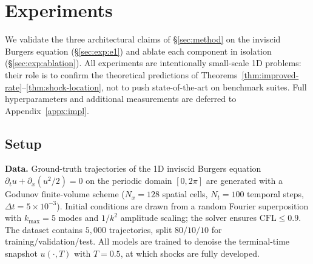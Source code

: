 %
\section{Experiments}
\label{sec:experiments}

We validate the three architectural claims of \S\ref{sec:method} on the
inviscid Burgers equation (\S\ref{sec:exp:e1}) and ablate each component in
isolation (\S\ref{sec:exp:ablation}). All experiments are intentionally
small-scale 1D problems: their role is to confirm the theoretical predictions
of Theorems~\ref{thm:improved-rate}--\ref{thm:shock-location}, not to push
state-of-the-art on benchmark suites. Full hyperparameters and additional
measurements are deferred to Appendix~\ref{appx:impl}.

\subsection{Setup}
\label{sec:exp:setup}

\textbf{Data.} Ground-truth trajectories of the 1D inviscid Burgers equation
$\partial_{t}u + \partial_{x}(u^{2}/2) = 0$ on the periodic domain $[0,
2\pi]$ are generated with a Godunov finite-volume scheme ($N_{x}=128$ spatial
cells, $N_{t}=100$ temporal steps, $\Delta t = 5\times10^{-3}$). Initial
conditions are drawn from a random Fourier superposition with $k_{\max}=5$
modes and $1/k^{2}$ amplitude scaling; the solver ensures $\mathrm{CFL} \le
0.9$. The dataset contains $5{,}000$ trajectories, split $80/10/10$ for
training/validation/test. All models are trained to denoise the
terminal-time snapshot $u(\cdot, T)$ with $T=0.5$, at which shocks are fully
developed.

